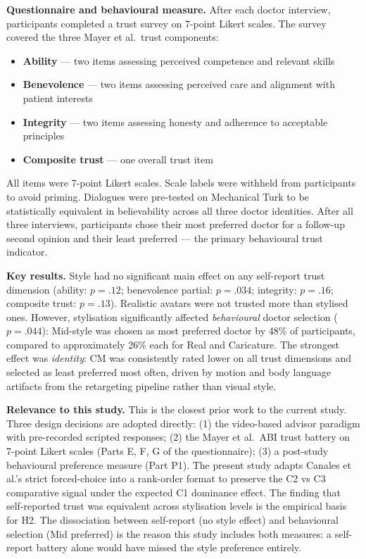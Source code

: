 \documentclass[11pt, a4paper]{article}
\begin{document}
\medskip
\noindent\textbf{Questionnaire and behavioural measure.} After each doctor interview, participants completed a trust survey on 7-point Likert scales. The survey covered the three Mayer et al.\ trust components:

\begin{itemize}
  \item \textbf{Ability} --- two items assessing perceived competence and relevant skills
  \item \textbf{Benevolence} --- two items assessing perceived care and alignment with patient interests
  \item \textbf{Integrity} --- two items assessing honesty and adherence to acceptable principles
  \item \textbf{Composite trust} --- one overall trust item
\end{itemize}

All items were 7-point Likert scales. Scale labels were withheld from participants to avoid priming. Dialogues were pre-tested on Mechanical Turk to be statistically equivalent in believability across all three doctor identities. After all three interviews, participants chose their most preferred doctor for a follow-up second opinion and their least preferred --- the primary behavioural trust indicator.

\medskip
\noindent\textbf{Key results.} Style had no significant main effect on any self-report trust dimension (ability: $p = .12$; benevolence partial: $p = .034$; integrity: $p = .16$; composite trust: $p = .13$). Realistic avatars were not trusted more than stylised ones. However, stylisation significantly affected \textit{behavioural} doctor selection ($p = .044$): Mid-style was chosen as most preferred doctor by 48\% of participants, compared to approximately 26\% each for Real and Caricature. The strongest effect was \textit{identity}: CM was consistently rated lower on all trust dimensions and selected as least preferred most often, driven by motion and body language artifacts from the retargeting pipeline rather than visual style.

\medskip
\noindent\textbf{Relevance to this study.} This is the closest prior work to the current study. Three design decisions are adopted directly: (1) the video-based advisor paradigm with pre-recorded scripted responses; (2) the Mayer et al.\ ABI trust battery on 7-point Likert scales (Parts E, F, G of the questionnaire); (3) a post-study behavioural preference measure (Part P1). The present study adapts Canales et al.'s strict forced-choice into a rank-order format to preserve the C2 vs C3 comparative signal under the expected C1 dominance effect. The finding that self-reported trust was equivalent across stylisation levels is the empirical basis for H2. The dissociation between self-report (no style effect) and behavioural selection (Mid preferred) is the reason this study includes both measures: a self-report battery alone would have missed the style preference entirely.
\end{document}
